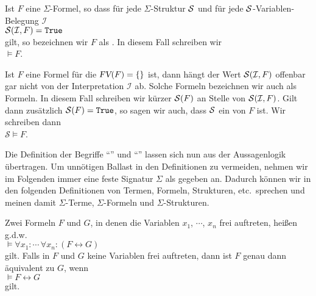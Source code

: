 \begin{Definition}[Allgemeingültig]
    Ist $F$ eine $\Sigma$-Formel, so dass für jede $\Sigma$-Struktur $\mathcal{S}$ und für jede
    $\mathcal{S}$-Variablen-Belegung $\mathcal{I}$ \\[0.2cm]
    \hspace*{1.3cm} $\mathcal{S}(\mathcal{I}, F) = \mathtt{True}$ \\[0.2cm]
    gilt, so bezeichnen wir $F$ als .  In diesem Fall schreiben wir \\[0.2cm]
    \hspace*{1.3cm} $\models F$. 
    \eox
\end{Definition}

Ist $F$ eine Formel für die $\textsl{FV}(F) = \{\}$ ist, dann hängt der Wert $\mathcal{S}(\mathcal{I}, F)$ 
offenbar gar nicht von der Interpretation $\mathcal{I}$ ab.  Solche Formeln bezeichnen wir auch als 
 Formeln.   In diesem Fall schreiben wir kürzer  $\mathcal{S}(F)$
an Stelle von $\mathcal{S}(\mathcal{I}, F)$.  Gilt dann zusätzlich $\mathcal{S}(F) = \mathtt{True}$, 
so sagen wir auch, dass $\mathcal{S}$ ein  von $F$ ist.  Wir schreiben dann \\[0.2cm]
\hspace*{1.3cm} $\mathcal{S} \models F$.
\vspace{0.1cm}

Die Definition der Begriffe ``'' und
``'' lassen sich nun aus der Aussagenlogik übertragen. 
Um unnötigen Ballast in den Definitionen zu vermeiden, nehmen wir im Folgenden immer eine
feste Signatur $\Sigma$ als gegeben an.  Dadurch können wir in den folgenden Definitionen
von Termen, Formeln, Strukturen, etc.~sprechen und meinen damit  $\Sigma$-Terme,
$\Sigma$-Formeln und $\Sigma$-Strukturen.

\begin{Definition}[Äquivalent]
  Zwei Formeln $F$ und $G$, in denen die Variablen $x_1$, $\cdots$, $x_n$ frei auftreten, heißen
   g.d.w.  
  \\[0.2cm] 
  \hspace*{1.3cm}
  $\models \forall x_1: \cdots\, \forall x_n: (F \leftrightarrow G)$
  \\[0.2cm] 
  gilt.  Falls in $F$ und $G$ keine Variablen frei auftreten, dann ist $F$ genau dann äquivalent zu $G$, wenn
  \\[0.2cm]
  \hspace*{1.3cm}
  $\models F \leftrightarrow G$
  \\[0.2cm]
  gilt.
  \eox
\end{Definition}


